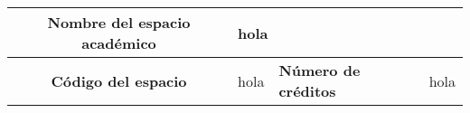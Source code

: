 \documentclass[letterpaper,11pt]{article}
\begin{document}
\begin{multicols}{2}

\begin{tabularx}{\textwidth}{| c | X | X | X |}
    \hline
    \textbf{Nombre del espacio académico} & \multicolumn{3}{l}{hola} \\ \hline
    \textbf{Código del espacio} & hola & \textbf{Número de créditos} & hola \\ \hline 
\end{tabularx}

\end{multicols}
\end{document}

